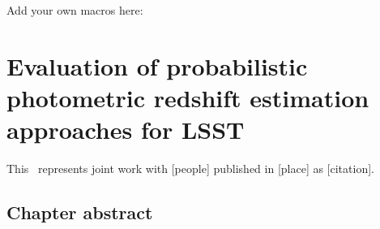 \renewcommand{\chapid}{pzdc1}


 Add your own macros here:

\newcommand{\proj}[1]{\textsc{#1}}
\newcommand{\des}{\proj{DES}}
\newcommand{\sdss}{\proj{SDSS}}
\newcommand{\buzz}{\proj{Buzzard}}

\newcommand{\chisq}{$\chi^{2}$}

\newcommand{\pzcode}[1]{\texttt{#1}}
\newcommand{\annz}{\pzcode{ANNz2}}
\newcommand{\bpz}{\pzcode{BPz}}
\newcommand{\cmnn}{\pzcode{CMNN}}
\newcommand{\delight}{\pzcode{Delight}}
\newcommand{\eazy}{\pzcode{EAZY}}
\newcommand{\flexzboost}{\pzcode{FlexZBoost}}
\newcommand{\gpz}{\pzcode{GPz}}
\newcommand{\lephare}{\pzcode{LePhare}}
\newcommand{\metaphor}{\pzcode{METAPhoR}}
\newcommand{\skynet}{\pzcode{SkyNet}}
\newcommand{\tpz}{\pzcode{TPZ}}
\newcommand{\trainz}{\pzcode{trainZ}}
\def\X{{\mathbf{X}}}
\def\x{{\mathbf{x}}}
\def\E{{\mathbb{E}}}

\chapter{ Evaluation of probabilistic photometric redshift estimation approaches for \textsc{LSST}}

This \paper\ represents joint work with [people] published in [place] as [citation].

\section{Chapter abstract}

